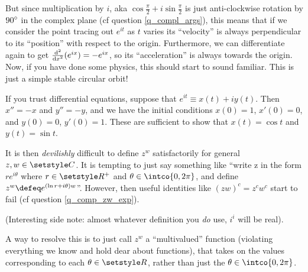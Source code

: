 But since multiplication by \(i\), aka
\(\cos \frac \pi 2 + i \sin \frac \pi 2\) is just anti-clockwise rotation by
\({90}^\circ\) in the complex plane (cf question \ref{q_compl_args}), this
means that if we consider the point tracing out \(e^{it}\) as \(t\) varies its
``velocity'' is always perpendicular to its ``position'' with respect to the
origin. Furthermore, we can differentiate again to get
\(\dv[2]{x} (e^{ix}) = -e^{ix}\), so its ``acceleration'' is always towards the
origin. Now, if you have done some physics, this should start to sound familiar.
This is just a simple stable circular orbit!

If you trust differential equations, suppose that
\(e^{it} \equiv x(t) + i y(t)\). Then \(x'' = -x\) and \(y'' = -y\), and we have
the initial conditions \(x(0) = 1\), \(x'(0) = 0\), and \(y(0) = 0\),
\(y'(0) = 1\). These are sufficient to show that
\(x(t) = \cos t\) and \(y(t) = \sin t\).

It is then \emph{devilishly} difficult to define \(z^w\) satisfactorily for
general \(z, w \in \Complex\). It is tempting to just say something like ``write
z in the form \(re^{i\theta}\) where \(r \in \Reals^+\) and
\(\theta \in \intco{0, 2\pi}\), and define
\(z^w \defeq e^{(\ln r + i\theta)w}\)''.
However, then useful identities like \((zw)^c = z^c w^c\) start to fail (cf
question \ref{q_comp_zw_exp}).

(Interesting side note: almost whatever definition you \emph{do} use, \(i^i\)
will be real).

A way to resolve this is to just call \(z^w\) a ``multivalued'' function
(violating everything we know and hold dear about functions), that takes on
the values corresponding to each \(\theta \in \Reals\), rather than just the
\(\theta \in \intco{0, 2\pi}\).
